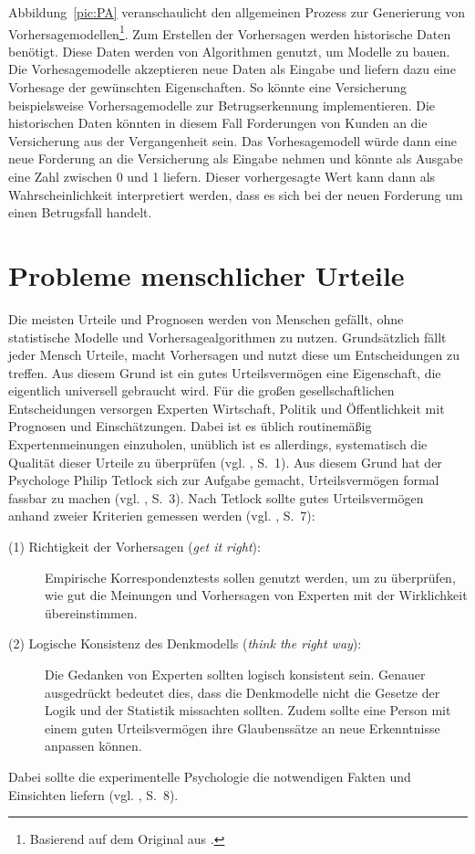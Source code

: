 Abbildung~\ref{pic:PA} veranschaulicht den allgemeinen Prozess zur Generierung
von Vorhersagemodellen\footnote{
Basierend auf dem Original aus \cite{Parthasarathy}.
}.
Zum Erstellen der Vorhersagen werden historische Daten benötigt. Diese Daten
werden von Algorithmen genutzt, um Modelle zu bauen. Die Vorhesagemodelle
akzeptieren neue Daten als Eingabe und liefern dazu eine Vorhesage der
gewünschten Eigenschaften. So könnte eine Versicherung beispielsweise
Vorhersagemodelle zur Betrugserkennung implementieren. Die historischen Daten
könnten in diesem Fall Forderungen von Kunden an die Versicherung aus der
Vergangenheit sein. Das Vorhesagemodell würde dann eine neue Forderung an die
Versicherung als Eingabe nehmen und könnte als Ausgabe eine Zahl zwischen 0 und
1 liefern. Dieser vorhergesagte Wert kann dann als Wahrscheinlichkeit
interpretiert werden, dass es sich bei der neuen Forderung um einen Betrugsfall
handelt. 


\section{Probleme menschlicher Urteile}

Die meisten Urteile und Prognosen werden von Menschen gefällt, ohne statistische
Modelle und Vorhersagealgorithmen zu nutzen. Grundsätzlich fällt jeder Mensch
Urteile, macht Vorhersagen und nutzt diese um Entscheidungen zu treffen. Aus
diesem Grund ist ein gutes Urteilsvermögen eine Eigenschaft, die eigentlich
universell gebraucht wird. Für die großen gesellschaftlichen Entscheidungen
versorgen Experten Wirtschaft, Politik und Öffentlichkeit mit Prognosen und
Einschätzungen. Dabei ist es üblich routinemäßig Expertenmeinungen einzuholen,
unüblich ist es allerdings, systematisch die Qualität dieser Urteile zu
überprüfen (vgl. \cite{Tetlock}, S.~1). Aus diesem Grund hat der Psychologe
Philip Tetlock sich zur Aufgabe gemacht,  Urteilsvermögen\grqq
formal fassbar zu machen (vgl. \cite{Tetlock}, S.~3). Nach Tetlock sollte gutes
Urteilsvermögen anhand zweier Kriterien gemessen werden (vgl. \cite{Tetlock},
S.~7):
\begin{description}
\item[(1) Richtigkeit der Vorhersagen (\emph{get it right}):]
Empirische Korrespondenztests sollen genutzt werden, um zu überprüfen, wie gut
die Meinungen und Vorhersagen von Experten mit der Wirklichkeit übereinstimmen.
\item[(2) Logische Konsistenz des Denkmodells (\emph{think the right way}):]
Die Gedanken von Experten sollten logisch konsistent sein. Genauer ausgedrückt
bedeutet dies, dass die Denkmodelle nicht die Gesetze der Logik und der
Statistik missachten sollten. Zudem sollte eine Person mit einem guten
Urteilsvermögen ihre Glaubenssätze an neue Erkenntnisse anpassen können.
\end{description}
Dabei sollte die experimentelle Psychologie die notwendigen Fakten und
Einsichten liefern (vgl. \cite{Tetlock}, S.~8).


